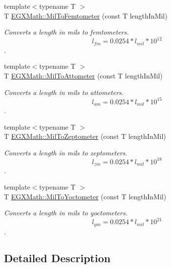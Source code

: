\begin{DoxyCompactItemize}
{\footnotesize template$<$typename T $>$ }\\T \mbox{\hyperlink{group___e_g_x_math-_conversions-_length_conversions-_imperial-_mil-_s_i_gae66c2e7eb61fb3348c0b95a70088fff9}{E\+G\+X\+Math\+::\+Mil\+To\+Femtometer}} (const T length\+In\+Mil)
\begin{DoxyCompactList}\small\item\em Converts a length in mils to femtometers. \[ l_{fm}=0.0254* l_{mil} * 10^{12} \]. \end{DoxyCompactList}\item 
{\footnotesize template$<$typename T $>$ }\\T \mbox{\hyperlink{group___e_g_x_math-_conversions-_length_conversions-_imperial-_mil-_s_i_ga73766988fce0feea206c432f3237e5c6}{E\+G\+X\+Math\+::\+Mil\+To\+Attometer}} (const T length\+In\+Mil)
\begin{DoxyCompactList}\small\item\em Converts a length in mils to attometers. \[ l_{am}=0.0254* l_{mil} * 10^{15} \]. \end{DoxyCompactList}\item 
{\footnotesize template$<$typename T $>$ }\\T \mbox{\hyperlink{group___e_g_x_math-_conversions-_length_conversions-_imperial-_mil-_s_i_ga2f5d6fae48c67d44f71200ac8189246f}{E\+G\+X\+Math\+::\+Mil\+To\+Zeptometer}} (const T length\+In\+Mil)
\begin{DoxyCompactList}\small\item\em Converts a length in mils to zeptometers. \[ l_{zm}=0.0254 * l_{mil} * 10^{18} \]. \end{DoxyCompactList}\item 
{\footnotesize template$<$typename T $>$ }\\T \mbox{\hyperlink{group___e_g_x_math-_conversions-_length_conversions-_imperial-_mil-_s_i_ga1420821a520a74457ec9d8dfe7ce1678}{E\+G\+X\+Math\+::\+Mil\+To\+Yoctometer}} (const T length\+In\+Mil)
\begin{DoxyCompactList}\small\item\em Converts a length in mils to yoctometers. \[ l_{ym}=0.0254 * l_{mil} * 10^{21} \]. \end{DoxyCompactList}\end{DoxyCompactItemize}


\subsection{Detailed Description}


